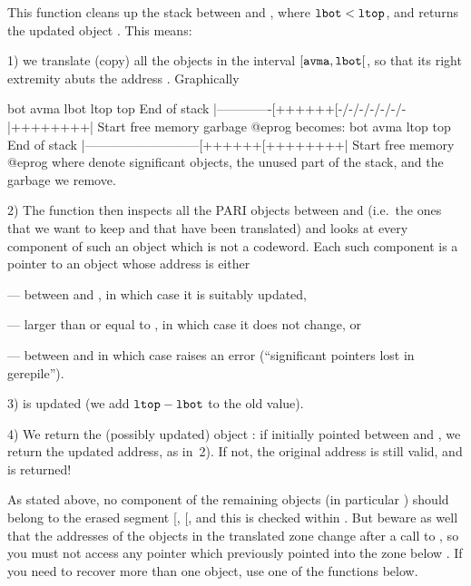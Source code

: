 \noindent
This function cleans up the stack between  and , where
${\tt lbot} < {\tt ltop}$, and returns the updated object . This means:

1) we translate (copy) all the objects in the interval
$[{\tt avma}, {\tt lbot}[$, so that its right extremity abuts the address
. Graphically

\vbox{\bprog
             bot           avma   lbot          ltop     top
End of stack  |-------------[++++++[-/-/-/-/-/-/-|++++++++|  Start
                free memory            garbage
@eprog
\noindent becomes:
\bprog
             bot                         avma   ltop     top
End of stack  |---------------------------[++++++[++++++++|  Start
                       free memory
@eprog
}
\noindent where \kbd{++} denote significant objects, \kbd{--} the unused part
of the stack, and \kbd{-/-} the garbage we remove.

2) The function then inspects all the PARI objects between  and
 (i.e.~the ones that we want to keep and that have been translated)
and looks at every component of such an object which is not a codeword. Each
such component is a pointer to an object whose address is either

--- between  and , in which case it is suitably updated,

--- larger than or equal to , in which case it does not change, or

--- between  and  in which case 
raises an error (``significant pointers lost in gerepile'').

3)  is updated (we add ${\tt ltop} - {\tt lbot}$ to the old value).

4) We return the (possibly updated) object : if  initially
pointed between  and , we return the updated address, as
in~2). If not, the original address is still valid, and is returned!

As stated above, no component of the remaining objects (in particular
) should belong to the erased segment [, [, and
this is checked within . But beware as well that the addresses
of the objects in the translated zone change after a call to ,
so you must not access any pointer which previously pointed into the zone
below . If you need to recover more than one object, use one of the
 functions below.

